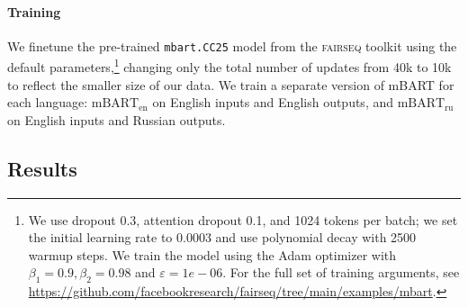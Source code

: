 \paragraph{Training} We finetune the pre-trained \texttt{mbart.CC25} model from the \textsc{fairseq} toolkit \citep{ott2019fairseq} using the default parameters,\footnote{We use dropout 0.3, attention dropout 0.1, and 1024 tokens per batch; we set the initial learning rate to 0.0003 and use polynomial decay with 2500 warmup steps. We train the model using the Adam optimizer \cite{kingma2014adam} with $\beta_1=0.9, \beta_2=0.98$ and $\varepsilon=1e-06$. For the full set of training arguments, see \url{https://github.com/facebookresearch/fairseq/tree/main/examples/mbart}.} changing only the total number of updates from 40k to 10k to reflect the smaller size of our data. We train a separate version of mBART for each language: $\text{mBART}_{\text{en}}$ on English inputs and English outputs, and $\text{mBART}_{\text{ru}}$ on English inputs and Russian outputs.



\subsection{Results}
\label{sec:finetuning:res}

